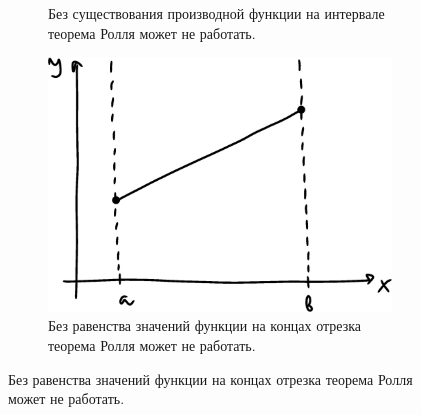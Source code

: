 \documentclass[a4paper,12pt]{article}
\begin{document}
\begin{solution}
\begin{figure}[ht]
\begin{subfigure}[b]{0.32\textwidth}
        \caption{Без существования производной функции на интервале теорема Ролля может не работать.}
        \label{fig:1-16-33-b}
      \end{subfigure}
      \hfill
      \begin{subfigure}[b]{0.32\textwidth}
        \centering
        
        \includegraphics[width=\columnwidth]{images/not-roll-c}
        
        \caption{Без равенства значений функции на концах отрезка теорема Ролля может не работать.}
        \label{fig:1-16-33-c}
      \end{subfigure}
    \end{figure}

        
        

        
        

        
        

  \end{solution}
\end{document}
